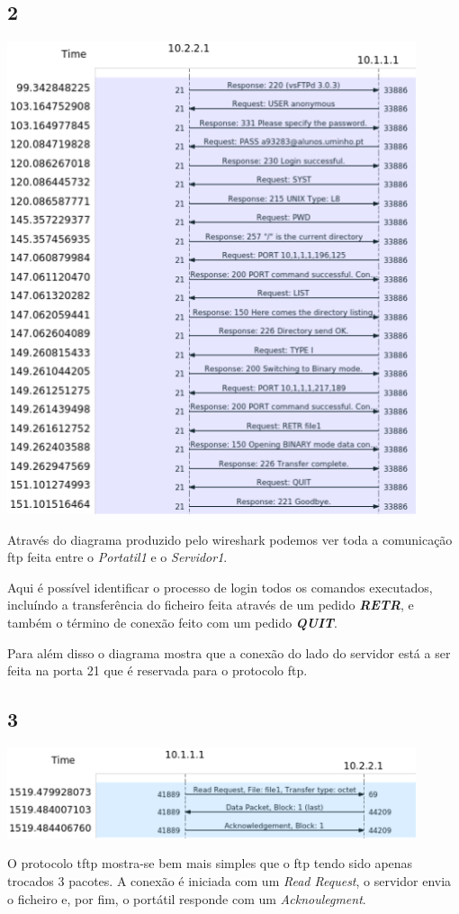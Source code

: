 \documentclass{article}
\begin{document}
        \subsection*{2}
            {
                \centering
                \includegraphics[width=12cm]{images/ftp-flow-graph.png}
                \par
            }
                Através do diagrama produzido pelo wireshark podemos ver toda a comunicação ftp feita entre o \textit{Portatil1} e o \textit{Servidor1}.

                Aqui é possível identificar o processo de login todos os comandos executados, incluíndo a transferência do ficheiro feita através de um pedido \textbf{\textit{RETR}}, e também o término de conexão
            feito com um pedido \textbf{\textit{QUIT}}.
                
                Para além disso o diagrama mostra que a conexão do lado do servidor está a ser feita na porta 21 que é reservada para o protocolo ftp.
        \subsection*{3}
            {
                \centering
                \includegraphics[width=12cm]{images/tftp-wireshark-flow-graph.png}
                \par
            }
                O protocolo tftp mostra-se bem mais simples que o ftp tendo sido apenas trocados 3 pacotes.
            A conexão é iniciada com um \textit{Read Request}, o servidor envia o ficheiro e, por fim, o portátil responde com um \textit{Acknoulegment}.
\end{document}
